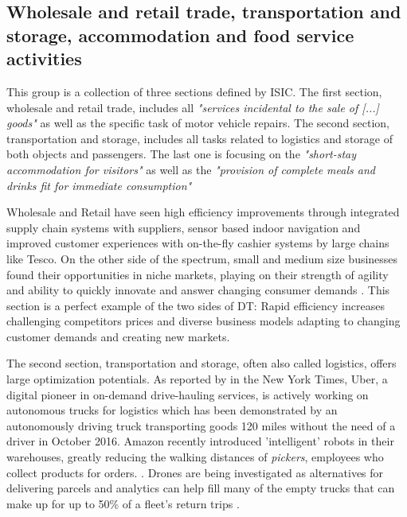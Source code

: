 \subsection{Wholesale and retail trade, transportation and storage, accommodation and food service activities}

This group is a collection of three sections defined by \ac{ISIC}. The first section, wholesale and retail trade, includes all \emph{"services incidental to the sale of [...] goods"}\cite[p.179]{ISIC:2008} as well as the specific task of motor vehicle repairs. The second section, transportation and storage, includes all tasks related to logistics and storage of both objects and passengers.\cite[p.194]{ISIC:2008} The last one is focusing on the \emph{"short-stay accommodation for visitors"} as well as the \emph{"provision of complete meals and drinks fit for immediate consumption"}\cite[p.202]{ISIC:2008}

Wholesale and Retail have seen high efficiency improvements through integrated supply chain systems with suppliers, sensor based indoor navigation and improved customer experiences with on-the-fly cashier systems \cite{tescoretail:2015, iicretailbrick:2016} by large chains like Tesco. On the other side of the spectrum, small and medium size businesses found their opportunities in niche markets, playing on their strength of agility and ability to quickly innovate and answer changing consumer demands \cite{pwcretailrenaissance:2016}. This section is a perfect example of the two sides of \ac{DT}: Rapid efficiency increases challenging competitors prices and diverse business models adapting to changing customer demands and creating new markets. 

The second section, transportation and storage, often also called logistics, offers large optimization potentials. As reported by \citeauthor{nytimesdrivingtruck:2016} in the New York Times, Uber, a digital pioneer in on-demand drive-hauling services, is actively working on autonomous trucks for logistics which has been demonstrated by an autonomously driving truck transporting goods 120 miles without the need of a driver in October 2016. Amazon recently introduced 'intelligent' robots in their warehouses, greatly reducing the walking distances of \emph{pickers}, employees who collect products for orders. \cite{Kiva:amazon:Ma:2016:OTA:2936924.2937092}. Drones are being investigated as alternatives for delivering parcels and analytics can help fill many of the empty trucks that can make up for up to 50\% of a fleet's return trips \cite{worldforumlogistics:2016}.

